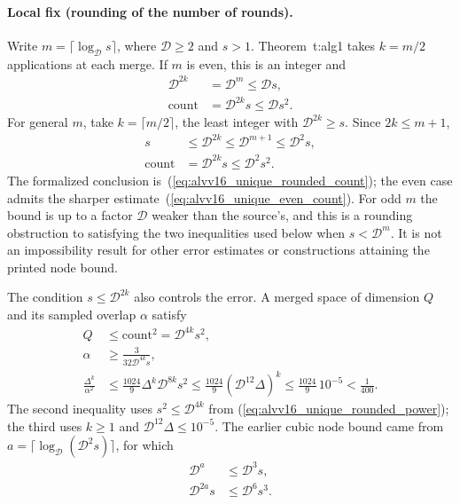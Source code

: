 \documentclass{article}
\begin{document}
\paragraph{Local fix (rounding of the number of rounds).}
Write $m=\lceil\log_{\mathcal D}s\rceil$, where $\mathcal D\ge2$ and
$s>1$. Theorem~t:alg1 takes $k=m/2$ applications at each merge. If $m$ is
even, this is an integer and
\begin{align}
    \mathcal D^{2k}&=\mathcal D^m\le\mathcal Ds,
    \label{eq:alvv16_unique_even_power}\\
    \mathrm{count}&=\mathcal D^{2k}s\le\mathcal Ds^2.
    \label{eq:alvv16_unique_even_count}
\end{align}
For general $m$, take $k=\lceil m/2\rceil$, the least integer with
$\mathcal D^{2k}\ge s$. Since $2k\le m+1$,
\begin{align}
    s&\le\mathcal D^{2k}\le\mathcal D^{m+1}\le\mathcal D^2s,
    \label{eq:alvv16_unique_rounded_power}\\
    \mathrm{count}&=\mathcal D^{2k}s\le\mathcal D^2s^2.
    \label{eq:alvv16_unique_rounded_count}
\end{align}
The formalized conclusion is~(\ref{eq:alvv16_unique_rounded_count}); the even case
admits the sharper estimate~(\ref{eq:alvv16_unique_even_count}). For odd $m$ the
bound is up to a factor $\mathcal D$ weaker than the source's, and this is a
rounding obstruction to satisfying the two inequalities used below when
$s<\mathcal D^m$. It is not an impossibility result for other error
estimates or constructions attaining the printed node bound.

The condition $s\le\mathcal D^{2k}$ also controls the error. A merged space
of dimension $Q$ and its sampled overlap $\alpha$ satisfy
\begin{align}
    Q&\le\mathrm{count}^2=\mathcal D^{4k}s^2,\nonumber\\
    \alpha&\ge\frac{3}{32\mathcal D^{4k}s},
    \label{eq:alvv16_unique_sample_overlap}\\
    \frac{\Delta^k}{\alpha^2}
    &\le\frac{1024}{9}\Delta^k\mathcal D^{8k}s^2
    \le\frac{1024}{9}(\mathcal D^{12}\Delta)^k
    \le\frac{1024}{9}\,10^{-5}<\frac1{400}.
    \label{eq:alvv16_unique_power_error}
\end{align}
The second inequality uses $s^2\le\mathcal D^{4k}$ from
(\ref{eq:alvv16_unique_rounded_power}); the third uses $k\ge1$ and
$\mathcal D^{12}\Delta\le10^{-5}$. The earlier cubic node bound came from
$a=\lceil\log_{\mathcal D}(\mathcal D^2s)\rceil$, for which
\begin{align}
    \mathcal D^a&\le\mathcal D^3s,\nonumber\\
    \mathcal D^{2a}s&\le\mathcal D^6s^3.
    \label{eq:alvv16_unique_old_cubic_count}
\end{align}
\end{document}
